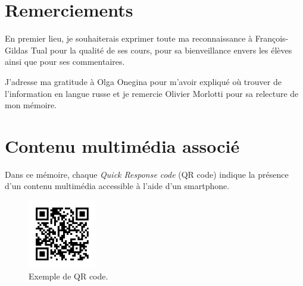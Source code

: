 
\section*{Remerciements}

En premier lieu, je souhaiterais exprimer toute ma reconnaissance à François-Gildas
Tual pour la qualité de ses cours, pour sa bienveillance envers les élèves ainsi
que pour ses commentaires.

J'adresse ma gratitude à Olga Onegina pour m’avoir expliqué où trouver de
l'information en langue russe et je remercie Olivier Morlotti pour sa relecture
de mon mémoire.


\vspace{4.0cm}


\section*{Contenu multimédia associé}

Dans ce mémoire, chaque \emph{Quick Response code} (QR code) indique la
présence d'un contenu multimédia accessible à l'aide d'un smartphone.

\begin{figure}[!ht]
  \begin{bigcenter}
    \includegraphics[width=3cm, keepaspectratio]{qr-cover.pdf}
  \end{bigcenter}
  \caption{Exemple de QR code.}
\end{figure}

